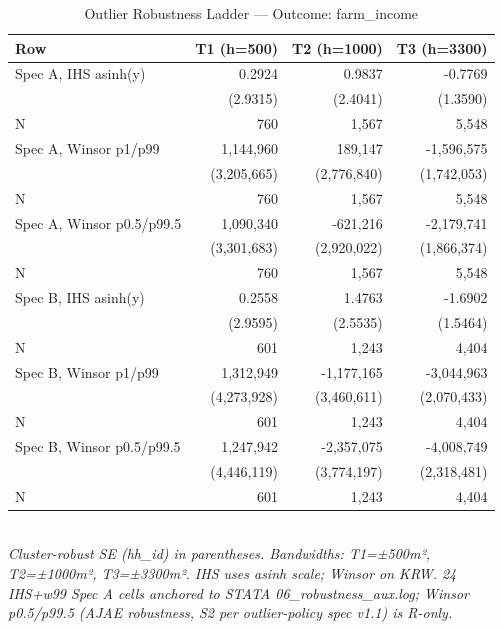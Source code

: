 \begin{table}[t]
\centering
\caption{Outlier Robustness Ladder — Outcome: farm_income}
\label{tab:rob_outlier_farm_income_en}
\begin{tabular}{lrrr}
\toprule
Row & T1 (h=500) & T2 (h=1000) & T3 (h=3300) \\
\midrule
Spec A, IHS asinh(y) & 0.2924 & 0.9837 & -0.7769 \\
        & (2.9315) & (2.4041) & (1.3590) \\
N       & 760 & 1,567 & 5,548 \\
Spec A, Winsor p1/p99 & 1,144,960 & 189,147 & -1,596,575 \\
        & (3,205,665) & (2,776,840) & (1,742,053) \\
N       & 760 & 1,567 & 5,548 \\
Spec A, Winsor p0.5/p99.5 & 1,090,340 & -621,216 & -2,179,741 \\
        & (3,301,683) & (2,920,022) & (1,866,374) \\
N       & 760 & 1,567 & 5,548 \\
Spec B, IHS asinh(y) & 0.2558 & 1.4763 & -1.6902 \\
        & (2.9595) & (2.5535) & (1.5464) \\
N       & 601 & 1,243 & 4,404 \\
Spec B, Winsor p1/p99 & 1,312,949 & -1,177,165 & -3,044,963 \\
        & (4,273,928) & (3,460,611) & (2,070,433) \\
N       & 601 & 1,243 & 4,404 \\
Spec B, Winsor p0.5/p99.5 & 1,247,942 & -2,357,075 & -4,008,749 \\
        & (4,446,119) & (3,774,197) & (2,318,481) \\
N       & 601 & 1,243 & 4,404 \\
\bottomrule
\end{tabular}
\\
\footnotesize\textit{Cluster-robust SE (hh_id) in parentheses. Bandwidths: T1=±500m², T2=±1000m², T3=±3300m². IHS uses asinh scale; Winsor on KRW. 24 IHS+w99 Spec A cells anchored to STATA 06_robustness_aux.log; Winsor p0.5/p99.5 (AJAE robustness, S2 per outlier-policy spec v1.1) is R-only.}
\end{table}


